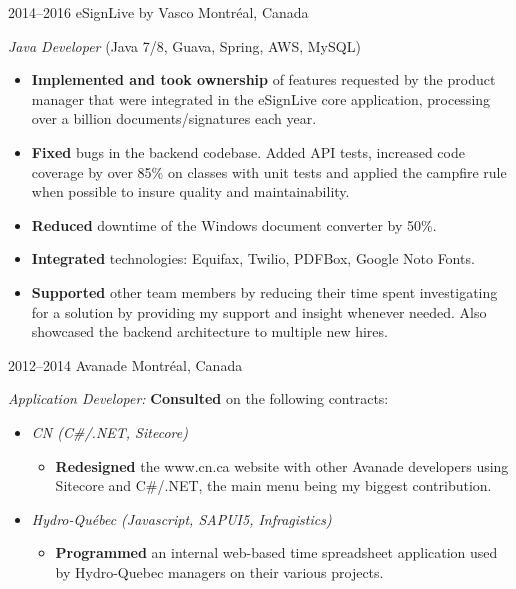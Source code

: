 \documentclass[]{friggeri-cv}
\begin{document}
\begin{entrylist}
\entry
{2014--2016}
{eSignLive by Vasco}
{Montréal, Canada}
{\emph{Java Developer} (Java 7/8, Guava, Spring, AWS, MySQL)
\begin{itemize}
\item \textbf{Implemented and took ownership} of features requested by the product manager that were integrated in the eSignLive core application, processing over a billion documents/signatures each year.
\item \textbf{Fixed} bugs in the backend codebase. Added API tests, increased code coverage by over 85\% on classes with unit tests and applied the campfire rule when possible to insure quality and maintainability.
\item \textbf{Reduced} downtime of the Windows document converter by 50\%.
\item \textbf{Integrated} technologies: Equifax, Twilio, PDFBox, Google Noto Fonts.
\item \textbf{Supported} other team members by reducing their time spent investigating for a solution by providing my support and insight whenever needed. Also showcased the backend architecture to multiple new hires.
\end{itemize}
}


\entry
{2012--2014}
{Avanade}
{Montréal, Canada}
{\emph{Application Developer:}
\textbf{Consulted} on the following contracts:
\begin{itemize}
\item \emph{CN (C\#/.NET, Sitecore)}
\begin{itemize}
	\item \textbf{Redesigned} the www.cn.ca website with other Avanade developers using Sitecore and C\#/.NET, the main menu being my biggest contribution.
\end{itemize}
\item \emph{Hydro-Québec (Javascript, SAPUI5, Infragistics)}
\begin{itemize}
	\item \textbf{Programmed} an internal web-based time spreadsheet application used by Hydro-Quebec managers on their various projects.
\end{itemize}
\end{itemize}
}
\end{entrylist}

\newpage
\end{document}
